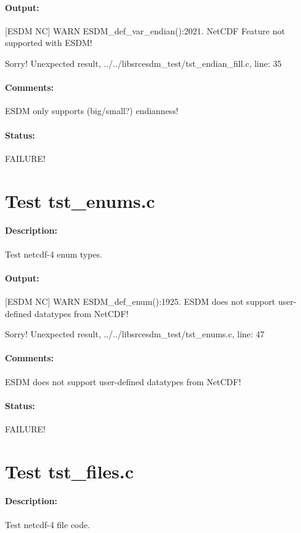 \paragraph{Output:} [ESDM NC] WARN ESDM\_def\_var\_endian():2021. NetCDF Feature not supported with ESDM!

Sorry! Unexpected result, ../../libsrcesdm\_test/tst\_endian\_fill.c, line: 35

\paragraph{Comments:} ESDM only supports (big/small?) endianness!

\paragraph{Status:} FAILURE!

\section{Test tst\_enums.c}

\paragraph{Description:} Test netcdf-4 enum types.

\paragraph{Output:} [ESDM NC] WARN ESDM\_def\_enum():1925. ESDM does not support user-defined datatypes from NetCDF!

Sorry! Unexpected result, ../../libsrcesdm\_test/tst\_enums.c, line: 47

\paragraph{Comments:} ESDM does not support user-defined datatypes from NetCDF!

\paragraph{Status:} FAILURE!

\section{Test tst\_files.c}

\paragraph{Description:} Test netcdf-4 file code.

